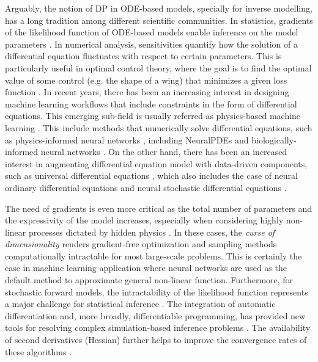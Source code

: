 Arguably, the notion of DP in ODE-based models, specially for inverse modelling, has a long tradition among different scientific communities.
In statistics, gradients of the likelihood function of ODE-based models enable inference on the model parameters \cite{ramsay2017dynamic}. 
In numerical analysis, sensitivities quantify how the solution of a differential equation fluctuates with respect to certain parameters. 
This is particularly useful in optimal control theory, where the goal is to find the optimal value of some control (e.g. the shape of a wing) that minimizes a given loss function \cite{Giles_Pierce_2000}. 
In recent years, there has been an increasing interest in designing machine learning workflows that include constraints in the form of differential equations.
This emerging sub-field is usually referred as physics-based machine learning \cite{Karniadakis_Kevrekidis_Lu_Perdikaris_Wang_Yang_2021, thuerey2021pbdl}.
This include methods that numerically solve differential equations, such as physics-informed neural networks \cite{PINNs_2019}, including NeuralPDEs \cite{Zubov_McCarthy_Ma_Calisto_Pagliarino_Azeglio_Bottero_Luján_Sulzer_Bharambe_et} and biologically-informed neural networks \cite{Lagergren_Nardini_Baker_Simpson_Flores_2020}. 
On the other hand, there has been an increased interest in augmenting differential equation model with data-driven components, such as universal differential equations \cite{rackauckas2020universal, Dandekar_2020}, which also includes the case of neural ordinary differential equations \cite{chen_neural_2019} and neural stochastic differential equations \cite{li2020scalable}.


The need of gradients is even more critical as the total number of parameters and the expressivity of the model increases, especially when considering highly non-linear processes dictated by hidden physics \cite{Karniadakis_Kevrekidis_Lu_Perdikaris_Wang_Yang_2021}.
In these cases, the \textit{curse of dimensionality} renders gradient-free optimization and sampling methods computationally intractable for most large-scale problems. 
This is certainly the case in machine learning application where neural networks are used as the default method to approximate general non-linear function. 
Furthermore, for stochastic forward models, the intractability of the likelihood function represents a major challenge for statistical inference \cite{Cranmer_Brehmer_Louppe_2020}.
The integration of automatic differentiation and, more broadly, differentiable programming, has provided new tools for resolving complex simulation-based inference problems \cite{Cranmer_Brehmer_Louppe_2020}.
The availability of second derivatives (Hessian) further helps to improve the convergence rates of these algorithms \cite{BuiThanh:2012ul}.


